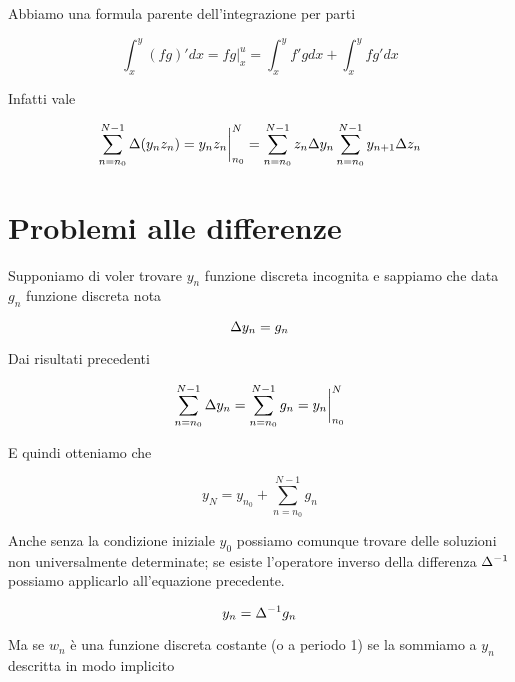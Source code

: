 \begin{proposition}
	Abbiamo una formula parente dell'integrazione per parti
	
	\begin{equation}
	\int_{x}^{y}
		(fg)'
		dx
	=
	f g
	\bigg\rvert_{x}^{u}
	=
	\int_{x}^{y}
		f'g
		dx
	+
	\int_{x}^{y}
		fg'
		dx
	\end{equation}
	
	Infatti vale
	
	\begin{equation}
		\sum
			\limits_{n=n_0}^{N-1}
			\Delta (y_n z_n)
		=
		y_n z_n  \bigg\rvert_{n_0}^{N}
		=
		\sum
			\limits_{n=n_0}^{N-1}
			z_n \Delta y_n
		\sum
			\limits_{n=n_0}^{N-1}
			y_{n+1} \Delta z_n
	\end{equation}
\end{proposition}

\section{Problemi alle differenze}

Supponiamo di voler trovare $y_n$ funzione discreta incognita e sappiamo che data $g_n$ funzione discreta nota

\begin{equation}
	\Delta y_n = g_n
\end{equation}

Dai risultati precedenti

\begin{equation}
	\sum
		\limits_{n=n_0}^{N-1}
		\Delta y_n
	=
	\sum
		\limits_{n=n_0}^{N-1}
		g_n
	=
	y_n \bigg\rvert_{n_0}^{N}
\end{equation}

E quindi otteniamo che 

\begin{equation}
	y_N
	=
	y_{n_0}
	+
	\sum
		\limits_{n=n_0}^{N-1}
		g_n
\end{equation}

Anche senza la condizione iniziale $y_0$ possiamo comunque trovare delle soluzioni non universalmente determinate; se esiste l'operatore inverso della differenza $\Delta^{-1}$ possiamo applicarlo all'equazione precedente.

\begin{equation}
	y_n
	=
	\Delta^{-1}
	g_n
\end{equation}

Ma se $w_n$ è una funzione discreta costante (o a periodo 1) se la sommiamo a $y_n$ descritta in modo implicito


